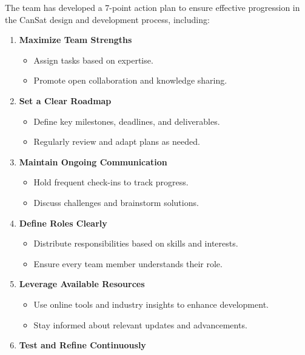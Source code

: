 \documentclass[11pt]{article}
\begin{document}
The team has developed a 7-point action plan to ensure effective progression in the CanSat design and development process, including:
\begin{enumerate}[topsep=3pt]
    \item \textbf{Maximize Team Strengths}
\begin{itemize}
    \item Assign tasks based on expertise.
    \item Promote open collaboration and knowledge sharing.
\end{itemize}

    \item \textbf{Set a Clear Roadmap}
\begin{itemize}
    \item Define key milestones, deadlines, and deliverables.
    \item Regularly review and adapt plans as needed.
\end{itemize}

    \item \textbf{Maintain Ongoing Communication}
\begin{itemize}
    \item Hold frequent check-ins to track progress.
    \item Discuss challenges and brainstorm solutions.
\end{itemize}

    \item \textbf{Define Roles Clearly}
\begin{itemize}
    \item Distribute responsibilities based on skills and interests.
    \item Ensure every team member understands their role.
\end{itemize}

    \item \textbf{Leverage Available Resources}
\begin{itemize}
    \item Use online tools and industry insights to enhance development.
    \item Stay informed about relevant updates and advancements.
\end{itemize}

    \item \textbf{Test and Refine Continuously}
 \end{enumerate}
\end{document}
